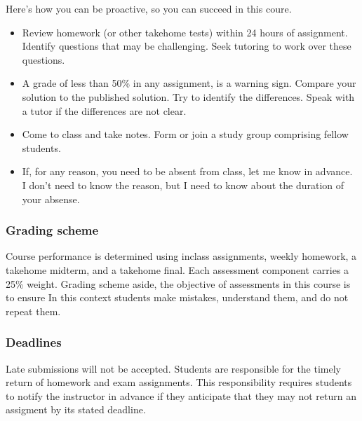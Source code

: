 \documentclass[letterpaper,10pt,english]{sphinxmanual}
\begin{document}
Here’s how you can be proactive, so you can succeed in this coure.
\begin{itemize}
\item {} 
Review homework (or other take\sphinxhyphen{}home tests) within 24 hours of assignment. Identify questions that may be challenging. Seek tutoring to work over these questions. 

\item {} 
A grade of less than 50\% in any assignment, is a warning sign. Compare your solution to the published solution. Try to identify the differences. Speak with a tutor if the differences are not clear.

\item {} 
Come to class and take notes. Form or join a study group comprising fellow students.

\item {} 
If, for any reason, you need to be absent from class, let me know in advance. I don’t need to know the reason, but I need to know about the duration of your absense.

\end{itemize}


\subsubsection{Grading scheme}
\label{\detokenize{COMP271/organization:grading-scheme}}
Course performance is determined using in\sphinxhyphen{}class assignments, weekly homework, a take\sphinxhyphen{}home midterm, and a take\sphinxhyphen{}home final. Each assessment component carries a 25\% weight. Grading scheme aside, the objective of assessments in this course is to ensure  In this context students make mistakes, understand them, and do not repeat them.


\subsubsection{Deadlines}
\label{\detokenize{COMP271/organization:deadlines}}
Late submissions will not be accepted. Students are responsible for the timely return of homework and exam assignments. This responsibility requires students to notify the instructor in advance if they anticipate that they may not return an assigment by its stated deadline.
\end{document}
